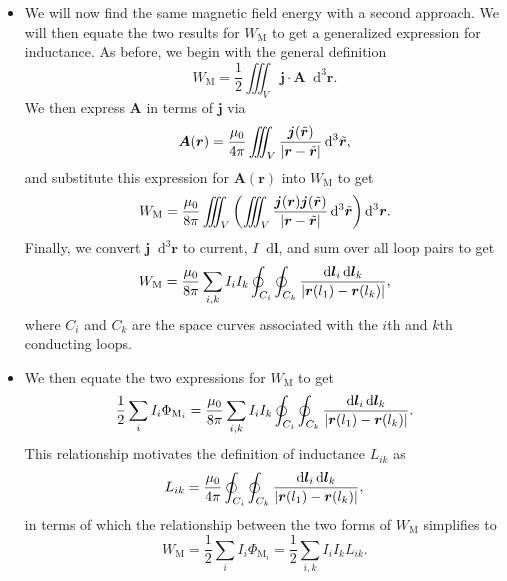 \documentclass[11pt, a4paper]{article}
\newcommand{\diff}{\mathop{}\!\mathrm{d}} %
\newcommand{\dr}{\diff^{3} \r}  %
\newcommand{\dtr}{\diff^{3} \tilde{\r}}  %
\renewcommand{\vec}[1]{\bm{#1}} %
\renewcommand{\t}[1]{\tilde{#1}} %
\renewcommand{\r}{\vec{r}}
\newcommand{\A}{\vec{A}} %
\newcommand{\mm}{\mu_{0}}  %
\renewcommand{\j}{\vec{j}}  %
\begin{document}
\begin{itemize}
	\item We will now find the same magnetic field energy with a second approach. We will then equate the two results for $ W_{\text{M}} $ to get a generalized expression for inductance. As before, we begin with the general definition
	\begin{equation*}
		W_{\text{M}} = \frac{1}{2}\iiint_{V} \j \cdot \A \dr.
	\end{equation*}
	We then express $ \A $ in terms of $ \j $ via
	\begin{equation*}
		\A(\r) = \frac{\mm}{4\pi}\iiint_{V}\frac{\j(\t{\r})}{\abs{\r - \t{\r}}}\dtr,
	\end{equation*}
    and substitute this expression for $ \A(\r) $ into $ W_{\text{M}} $ to get
	\begin{equation*}
		W_{\text{M}} = \frac{\mm}{8\pi}\iiint_{V} \left(\iiint_{V}\frac{\j(\r)\j(\t{\r})}{\abs{\r - \t{\r}}}\dtr\right)\dr.
	\end{equation*}
	Finally, we convert $ \j \dr $ to current, $ I \diff \vec{l} $, and sum over all loop pairs to get
	\begin{equation*}
		W_{\text{M}} = \frac{\mm}{8\pi}\sum_{i, k}I_{i}I_{k}\oint_{C_{i}}\oint_{C_{k}}\frac{\diff \vec{l}_{i}\diff \vec{l}_{k}}{\abs{\r(l_{1}) - \r(l_{k})}},
	\end{equation*}
	where $ C_{i} $ and $ C_{k} $ are the space curves associated with the $ i $th and $ k $th conducting loops.
	
	\item We then equate the two expressions for $ W_{\text{M}} $ to get
	\begin{equation*}
		\frac{1}{2}\sum_{i}I_{i}\Phi_{\text{M}_{i}} = \frac{\mm}{8\pi}\sum_{i, k}I_{i}I_{k}\oint_{C_{i}}\oint_{C_{k}}\frac{\diff \vec{l}_{i}\diff \vec{l}_{k}}{\abs{\r(l_{1}) - \r(l_{k})}}.
	\end{equation*}
    This relationship motivates the definition of inductance $ L_{ik} $ as
	\begin{equation*}
		L_{ik} = \frac{\mm}{4\pi}\oint_{C_{i}}\oint_{C_{k}}\frac{\diff \vec{l}_{i}\diff \vec{l}_{k}}{\abs{\r(l_{1}) - \r(l_{k})}},
	\end{equation*}
    in terms of which the relationship between the two forms of $ W_{\text{M}} $ simplifies to
	\begin{equation*}
        W_{\text{M}} = \frac{1}{2}\sum_{i}I_{i}\Phi_{\text{M}_{i}} = \frac{1}{2} \sum_{i, k}I_{i}I_{k} L_{ik}.
	\end{equation*}
	

\end{itemize}
\end{document}
